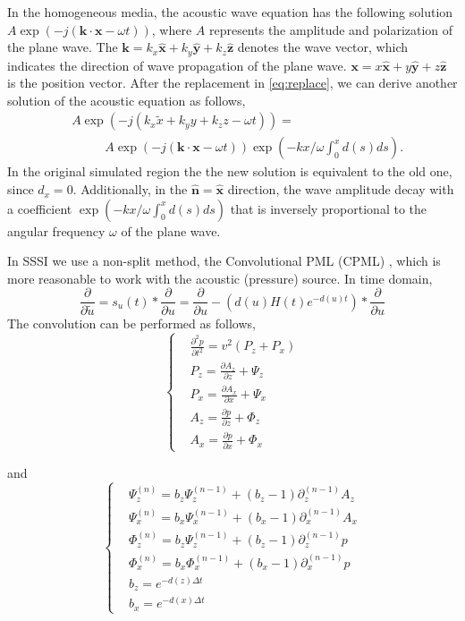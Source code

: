 \documentclass[11pt]{article}
\newcommand{\bx}{\boldsymbol{x}}
\newcommand{\bk}{\boldsymbol{k}}
\newcommand{\hx}{\hat{\mathbf{x}}}
\newcommand{\hy}{\hat{\mathbf{y}}}
\newcommand{\hz}{\hat{\mathbf{z}}}
\theoremstyle{plain}
\theoremstyle{definition}
\theoremstyle{remark}
\numberwithin{equation}{section}
\begin{document}
In the homogeneous media, the acoustic wave equation has the following solution $A \exp(-j (\bk \cdot \bx -\omega t))$, where $A$ represents the amplitude and polarization of the plane wave. The $\bk = k_x \hx + k_y \hy +k_z \hz$ denotes the wave vector, which 
indicates the direction of wave propagation of the plane wave. $\bx = x\hx +y\hy +z \hz$ is the position vector. After the replacement in \eqref{eq:replace}, we can derive another solution of the acoustic equation as follows,
\begin{equation}
\begin{aligned}
&A\exp(-j(k_x \tilde{x} + k_y y + k_z z -\omega t))=\\
 &~~~~~~~~~~~~A\exp(-j (\bk\cdot \bx -\omega t))\exp(-kx/\omega \int_0^x d(s)ds).
\end{aligned}
\end{equation}
In the original simulated region the the new solution is equivalent to the old one, since $d_x=0$. Additionally, in the $\hat{\mathbf{n}}= \hx$ direction, the wave amplitude decay with a coefficient $\exp(-kx/\omega \int_0^x d(s)ds)$ that is inversely proportional to the angular frequency $\omega$ of the plane wave. 

In SSSI we use a non-split method, the Convolutional PML (CPML) \cite{Luebbers:1992aa, Roden:2000aa, Komatitsch:2007aa}, which is more reasonable to work with the acoustic (pressure) source. In time domain,
  \begin{equation}
    \frac{\partial}{\partial \tilde{u}} = s_u(t) * \frac{\partial}{\partial u} = \frac{\partial}{\partial u} - \left(d(u)H(t)e^{-d(u)t}\right) * \frac{\partial}{\partial u}
  \end{equation}
The convolution can be performed as follows,
  \begin{equation}
  \label{eq:fwdTimeCpml}
  \left\{
  \begin{aligned}
  &\frac{\partial^2 p}{\partial t^2}=v^2(P_z+P_x)\\
  &P_z=\frac{\partial A_z}{\partial z}+\Psi_z\\
  &P_x=\frac{\partial A_x}{\partial x}+\Psi_x\\
  &A_z=\frac{\partial p}{\partial z}+\Phi_z\\
  &A_x=\frac{\partial p}{\partial x}+\Phi_x
  \end{aligned}
  \right.
  \end{equation}
  
  and  
  \begin{equation}
  \label{eq:fwdTimeCpml_var}
  \left\{
  \begin{aligned}
  &\Psi_z^{(n)}=b_z\Psi_z^{(n-1)}+(b_z-1)\partial_z^{(n-1)}A_z\\
  &\Psi_x^{(n)}=b_x\Psi_x^{(n-1)}+(b_x-1)\partial_x^{(n-1)}A_x\\
  &\Phi_z^{(n)}=b_z\Psi_z^{(n-1)}+(b_z-1)\partial_z^{(n-1)}p\\
  &\Phi_x^{(n)}=b_x\Phi_x^{(n-1)}+(b_x-1)\partial_x^{(n-1)}p\\
  &b_z = e^{-d(z)\Delta t}\\
  &b_x = e^{-d(x)\Delta t}
  \end{aligned}
  \right.
  \end{equation}
\end{document}
